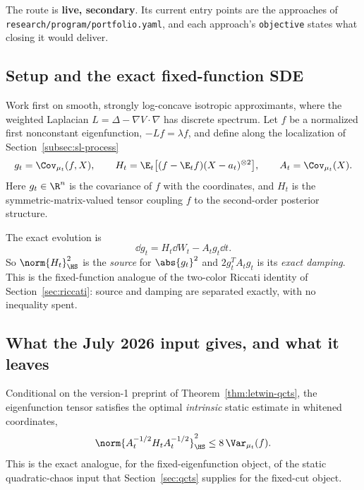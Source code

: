 \documentclass[../../main.tex]{subfiles}
\begin{document}
The route is \textbf{live, secondary}. Its current entry points are the approaches of
\texttt{research/program/portfolio.yaml}, and each approach's \texttt{objective} states what
closing it would deliver.

\subsection{Setup and the exact fixed-function SDE}
\label{subsec:spectral-sde}

Work first on smooth, strongly log-concave isotropic approximants, where the weighted Laplacian
$L=\Delta-\nabla V\cdot\nabla$ has discrete spectrum. Let $f$ be a normalized first nonconstant
eigenfunction, $-Lf=\lambda f$, and define along the localization of
Section~\ref{subsec:sl-process}
\begin{equation}
  g_t=\Cov_{\mu_t}(f,X),
  \qquad
  H_t=\E_t\bigl[(f-\E_tf)(X-a_t)^{\otimes2}\bigr],
  \qquad
  A_t=\Cov_{\mu_t}(X).
  \label{eq:spectral-quantities}
\end{equation}
Here $g_t\in\R^n$ is the covariance of $f$ with the coordinates, and $H_t$ is the
symmetric-matrix-valued tensor coupling $f$ to the second-order posterior structure.

The exact evolution is
\begin{equation}
  \dd g_t=H_t\dd W_t-A_tg_t\dd t .
  \label{eq:spectral-sde}
\end{equation}
So $\norm{H_t}_{\HS}^2$ is the \emph{source} for $\abs{g_t}^2$ and $2g_t^TA_tg_t$ is its
\emph{exact damping}. This is the fixed-function analogue of the two-color Riccati identity of
Section~\ref{sec:riccati}: source and damping are separated exactly, with no inequality spent.

\subsection{What the July 2026 input gives, and what it leaves}
\label{subsec:spectral-whitened}

Conditional on the version-1 preprint of Theorem~\ref{thm:letwin-qcts}, the eigenfunction tensor
satisfies the optimal \emph{intrinsic} static estimate in whitened coordinates,
\begin{equation}
  \norm{A_t^{-1/2}H_tA_t^{-1/2}}_{\HS}^2\le8\,\Var_{\mu_t}(f).
  \label{eq:whitened-tensor}
\end{equation}
This is the exact analogue, for the fixed-eigenfunction object, of the static quadratic-chaos
input that Section~\ref{sec:qcts} supplies for the fixed-cut object.
\end{document}

